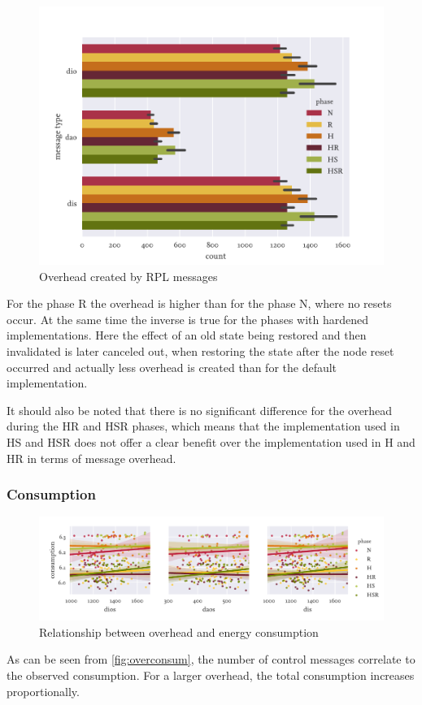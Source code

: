 \begin{figure}
  \centering
  \includegraphics[height=0.3\textheight]{../images/performance-overhead.pdf}
  \caption{Overhead created by \ac{RPL} messages}
  \label{fig:overhead}
\end{figure}

For the phase R the overhead is higher than for the phase N, where no resets
occur. At the same time the inverse is true for the phases with hardened
implementations. Here the effect of an old state being restored and then
invalidated is later canceled out, when restoring the state after the node reset
occurred and actually less overhead is created than for the default implementation.

It should also be noted that there is no significant difference for the overhead
during the HR and HSR phases, which means that the implementation used in HS and
HSR does not offer a clear benefit over the implementation used in H and HR in
terms of message overhead.

\subsubsection{Consumption}

\begin{figure}
  \centering
  \includegraphics[width=\textwidth]{../images/performance-consumption.pdf}
  \caption{Relationship between overhead and energy consumption}
  \label{fig:overconsum}
\end{figure}

As can be seen from \autoref{fig:overconsum}, the number of control messages
correlate to the observed consumption. For a larger overhead, the total
consumption increases proportionally.
